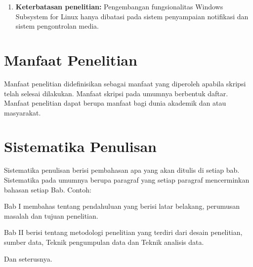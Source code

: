 \begin{enumerate}
    
    \item \textbf{Keterbatasan penelitian:} Pengembangan fungsionalitas Windows Subsystem for Linux hanya dibatasi pada sistem penyampaian notifikasi dan sistem pengontrolan media.
    
\end{enumerate}

\section{Manfaat Penelitian}

Manfaat penelitian didefinisikan sebagai manfaat yang diperoleh apabila 
skripsi telah selesai dilakukan. Manfaat skripsi pada umumnya berbentuk daftar. 
Manfaat penelitian dapat berupa manfaat bagi dunia akademik dan atau masyarakat.

\section{Sistematika Penulisan}

Sistematika penulisan berisi pembahasan apa yang akan ditulis di setiap bab. 
Sistematika pada umumnya berupa paragraf yang setiap paragraf mencerminkan 
bahasan setiap Bab. Contoh:

\noindent Bab I membahas tentang pendahuluan yang berisi latar belakang, perumusan masalah 
dan tujuan penelitian. 

\noindent Bab II berisi tentang metodologi penelitian yang terdiri dari desain penelitian, sumber data, Teknik pengumpulan data dan Teknik analisis data.

\noindent Dan seterusnya.

